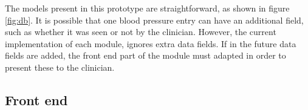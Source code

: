         The models present in this prototype are straightforward, as shown in figure \ref{fig:db}. It is possible that one blood pressure entry can have an additional field, such as whether it was seen or not by the clinician. However, the current implementation of each module, ignores extra data fields. If in the future data fields are added, the front end part of the module must adapted in order to present these to the clinician.



    \subsection{Front end}
